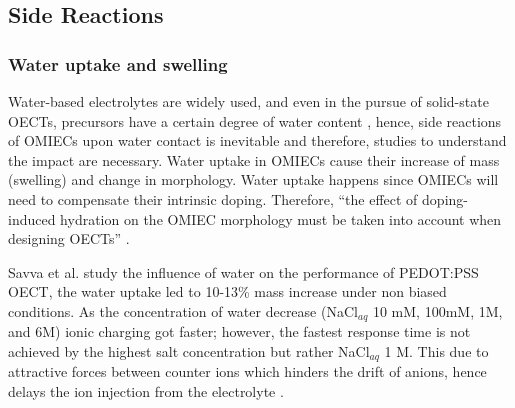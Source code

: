 \subsection{Side Reactions} \label{subsec:sidereac}



\subsubsection{Water uptake and swelling}

Water-based electrolytes are widely used, and even in the pursue of solid-state OECTs, precursors have a certain degree of water content \cite{weissbachPhotopatternableSolidElectrolyte2022}\cite{nguyen-dangBiomaterialBasedSolidElectrolyteOrganic2021}, hence, side reactions of OMIECs upon water contact is inevitable and therefore, studies to understand the impact are necessary.  %
Water uptake in OMIECs cause their increase of mass (swelling) and change in morphology. Water uptake happens since OMIECs will need to compensate their intrinsic doping. Therefore, ``the effect of doping-induced hydration on the OMIEC morphology must be taken into account when designing OECTs'' \cite{savvaBalancingIonicElectronic2020}.

Savva et al. study the influence of water on the performance of PEDOT:PSS OECT, the water uptake %
led to 10-13\% mass increase under non biased conditions. As the concentration of water decrease (NaCl$_{aq}$ 10 mM, 100mM, 1M, and 6M) ionic charging got faster; %
however, the fastest %
response time is not achieved by the highest salt concentration but rather NaCl$_{aq}$ 1 M. This due to attractive forces between counter ions which %
hinders the drift of anions, hence delays the ion injection from the electrolyte %
\cite{savvaInfluenceWaterPerformance2019}.

